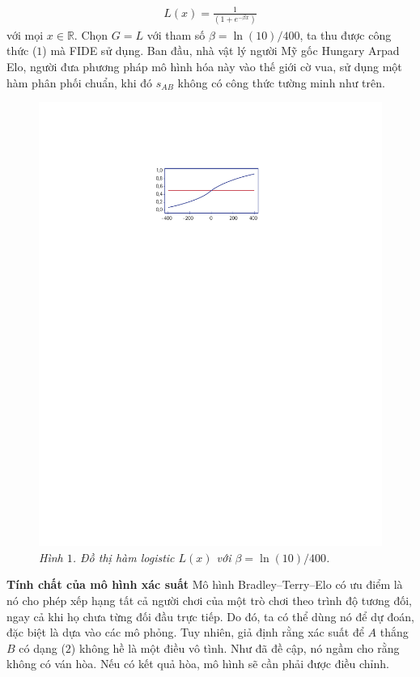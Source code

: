 \begin{multicols}{2}
	\vspace{-15pt}
	\begin{align*}
		L(x) = \frac{ 1 }{ (1 + e^{-\beta x}) }\tag{$3$}
	\end{align*}
	với mọi $x \in \mathbb R$.
	\vskip 0.1cm
	Chọn $G = L$ với tham số $\beta = \ln(10) / 400$, ta thu được công thức ($1$) mà FIDE sử dụng. Ban đầu, nhà vật lý người Mỹ gốc Hungary Arpad Elo, người đưa phương pháp mô hình hóa này vào thế giới cờ vua, sử dụng một hàm phân phối chuẩn, khi đó $s_{AB}$ không có công thức tường minh như trên.
	\begin{figure}[H]
		\vspace*{-5pt}
		\centering
		\captionsetup{labelformat= empty, justification=centering}
		\includegraphics[width= 0.8\linewidth]{pic1}
		\caption{\small\textit{\color{toanhocdoisong}Hình $1$. Đồ thị hàm logistic $L(x)$ với $\beta = \ln(10) / 400$.}}
		\vspace*{-10pt}
	\end{figure}
	\textbf{\color{toanhocdoisong}Tính chất của mô hình xác suất}
	\vskip 0.05cm
	Mô hình Bradley--Terry--Elo có ưu điểm là nó cho phép xếp hạng tất cả người chơi của một trò chơi theo trình độ tương đối, ngay cả khi họ chưa từng đối đầu trực tiếp. Do đó, ta có thể dùng nó để dự đoán, đặc biệt là dựa vào các mô phỏng.
	Tuy nhiên, giả định rằng xác suất để $A$ thắng $B$ có dạng ($2$) không hề là một điều vô tình. Như đã đề cập, nó ngầm cho rằng không có ván hòa. Nếu có kết quả hòa, mô hình sẽ cần phải được điều chỉnh.

\end{multicols}
